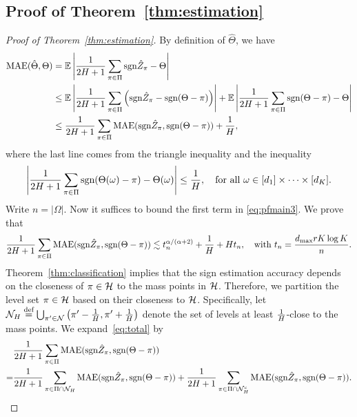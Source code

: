 \documentclass[11pt]{article}
\theoremstyle{plain}
\theoremstyle{definition}
\def\sign{\textup{sgn}}
\begin{document}
\subsection{Proof of Theorem~\ref{thm:estimation}}
\begin{proof}[Proof of Theorem~\ref{thm:estimation}]
By definition of $\hat\Theta$, we have
\begin{align}\label{eq:pfmain3}\nonumber
\text{MAE}(\hat\Theta,\Theta) &= \mathbb{E}\left|\frac{1}{2H+1}\sum_{\pi\in\Pi}\sign\hat Z_\pi-\Theta\right|\\\nonumber
&\leq \mathbb{E}\left|\frac{1}{2H+1}\sum_{\pi\in\Pi}\left(\sign\hat Z_\pi-\sign(\Theta-\pi)\right)\right|+\mathbb{E}\left|\frac{1}{2H+1}\sum_{\pi\in\Pi}\sign(\Theta-\pi)-\Theta\right|\\&
\leq \frac{1}{2H+1}\sum_{\pi\in\Pi}\text{MAE}(\sign\hat Z_\pi,\sign(\Theta-\pi))+\frac{1}{H},
\end{align}
where the last line comes  from the triangle inequality and the inequality
\begin{equation}
\left|\frac{1}{2H+1}\sum_{\pi\in\Pi}\sign(\Theta(\omega)-\pi)-\Theta(\omega)\right|\leq \frac{1}{H},\quad\text{for all } \omega\in[d_1]\times\cdots\times [d_K].
\end{equation}
Write $n=|\Omega|$. Now it suffices to bound  the first term in \eqref{eq:pfmain3}.  We prove that 
\begin{equation}\label{eq:total}
{1\over 2H+1}\sum_{\pi \in \Pi} \textup{MAE}(\sign \hat Z_\pi, \sign (\Theta-\pi)) \lesssim  t_n^{\alpha/(\alpha+2)}+{1\over H}+ H t_n, \quad \text{with } t_n={d_{\max}rK\log K\over n}.
\end{equation}
Theorem~\ref{thm:classification} implies that the  sign estimation accuracy depends on the closeness of $\pi\in \mathcal{H}$ to the mass points in $\mathcal{H}$. Therefore, we partition the level set $\pi \in \mathcal{H}$ based on their closeness to $\mathcal{H}$. Specifically, let $\mathcal{N}_H \stackrel{\text{def}}{=}\bigcup_{\pi'\in\mathcal{N}}\left(\pi'-\frac{1}{H},\pi'+\frac{1}{H}\right)$ denote the set of levels at least $1\over H$-close to the mass points. We expand~\eqref{eq:total} by
\begin{align}\label{eq:twobounds}
&{1\over 2H+1}\sum_{\pi \in \Pi} \textup{MAE}(\sign \hat Z_\pi, \sign (\Theta-\pi))\notag \\
=&{1\over 2H+1}\sum_{\pi \in \Pi\cap \tN_H} \textup{MAE}(\sign \hat Z_\pi, \sign (\Theta-\pi))+{1\over 2H+1}\sum_{\pi \in \Pi\cap \tN_H^c} \textup{MAE}(\sign \hat Z_\pi, \sign (\Theta-\pi)).
\end{align}

\end{proof}
\end{document}

